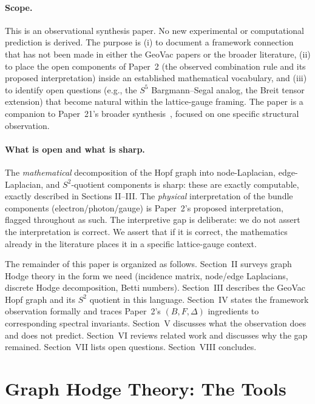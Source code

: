 \documentclass[aps,pra,twocolumn,superscriptaddress,longbibliography]{revtex4-2}
\begin{document}
\paragraph*{Scope.} This is an observational synthesis paper.  No new
experimental or computational prediction is derived.  The purpose is
(i) to document a framework connection that has not been made in
either the GeoVac papers or the broader literature, (ii) to place the
open components of Paper~2 (the observed combination rule and its
proposed interpretation) inside an established mathematical
vocabulary, and (iii) to identify open questions (e.g., the $S^5$
Bargmann--Segal analog, the Breit tensor extension) that become
natural within the lattice-gauge framing.  The paper is a
companion to Paper~21's broader synthesis~\cite{Paper21}, focused on
one specific structural observation.

\paragraph*{What is open and what is sharp.} The
\emph{mathematical} decomposition of the Hopf graph into
node-Laplacian, edge-Laplacian, and $S^2$-quotient components is
sharp: these are exactly computable, exactly described in Sections
II--III.  The \emph{physical} interpretation of the bundle components
(electron/photon/gauge) is Paper~2's proposed interpretation, flagged
throughout as such.  The interpretive gap is deliberate: we do not
assert the interpretation is correct.  We assert that if it is correct, the
mathematics already in the literature places it in a specific
lattice-gauge context.

The remainder of this paper is organized as follows.  Section~II
surveys graph Hodge theory in the form we need (incidence matrix,
node/edge Laplacians, discrete Hodge decomposition, Betti numbers).
Section~III describes the GeoVac Hopf graph and its $S^2$ quotient in
this language.  Section~IV states the framework observation formally
and traces Paper~2's $(B, F, \Delta)$ ingredients to corresponding
spectral invariants.  Section~V discusses what the observation does
and does not predict.  Section~VI reviews related work and discusses
why the gap remained.  Section~VII lists open questions.  Section~VIII
concludes.


\section{Graph Hodge Theory: The Tools}
\label{sec:hodge}
\end{document}
